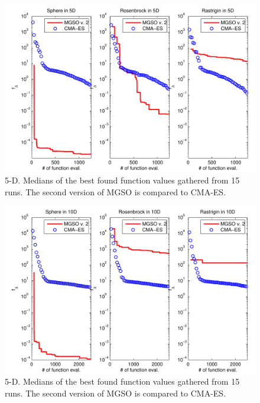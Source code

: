 \documentclass{itatnew}
\begin{document}
\begin{figure}
  \centering
  \includegraphics[width=\linewidth]{optim_5D_color}
  {\small
    \caption{5-D. Medians of the best found function values gathered from 15 runs. The second version of MGSO is compared to CMA-ES.
  \label{fig:optim_5D}
  }
  }
\end{figure}

\begin{figure}
  \centering
  \includegraphics[width=\linewidth]{optim_10D_color}
  {\small
    \caption{5-D. Medians of the best found function values gathered from 15 runs. The second version of MGSO is compared to CMA-ES.
  \label{fig:optim_10D}
  }
  }
\end{figure}
\end{document}
